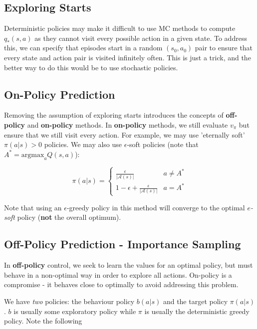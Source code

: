 \documentclass[11pt]{report}
\begin{document}
\subsection{Exploring Starts}
Deterministic policies may make it difficult to use MC methods to compute $q_*(s,a)$ as they cannot visit every possible action in a given state. To address this, we can specify that episodes start in a random $(s_0, a_0)$ pair to ensure that every state and action pair is visited infinitely often. This is just a trick, and the better way to do this would be to use stochastic policies.

\subsection{On-Policy Prediction}
Removing the assumption of exploring starts introduces the concepts of \textbf{off-policy} and \textbf{on-policy} methods. In \textbf{on-policy} methods, we still evaluate $v_\pi$ but ensure that we still visit every action. For example, we may use 'eternally soft' $\pi(a|s) > 0$ policies. We may also use $\epsilon$-soft policies (note that $A^*=\text{argmax}_{a}Q(s,a)$):

\begin{equation}
	\label{eqn:e-soft-policy}
	\pi(a|s) = \begin{cases}
 		\frac{\epsilon}{|\mathcal{A}(s)|} & a \neq A^*\\
 		1 - \epsilon + \frac{\epsilon}{|\mathcal{A}(s)|} & a = A^*
 	\end{cases}
\end{equation}

Note that using an $\epsilon$-greedy policy in this method will converge to the optimal \textit{$e$-soft} policy (\textbf{not} the overall optimum).

\subsection{Off-Policy Prediction - Importance Sampling}\label{sec:importance-sampling}
In \textbf{off-policy} control, we seek to learn the values for an optimal policy, but must behave in a non-optimal way in order to explore all actions. On-policy is a compromise - it behaves close to optimally to avoid addressing this problem.

We have \textit{two} policies: the behaviour policy $b(a|s)$ and the target policy $\pi(a|s)$. $b$ is usually some exploratory policy while $\pi$ is usually the deterministic greedy policy. Note the following
\end{document}
